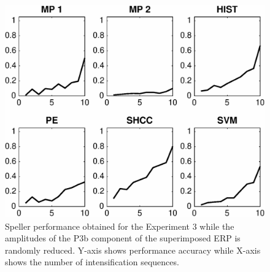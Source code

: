 \begin{figure}[h!]
\centering
\includegraphics[width=15cm]{images/CrossPerformanceTestAmplitude.eps}
\caption[Experiment III Pseudo-real Dataset III Speller Performance]{Speller performance obtained for the Experiment 3 while the amplitudes of the P3b component of the superimposed ERP is randomly reduced. Y-axis shows performance accuracy while X-axis shows the number of intensification sequences.}
\label{fig:performancetestamplitude}
\end{figure}

